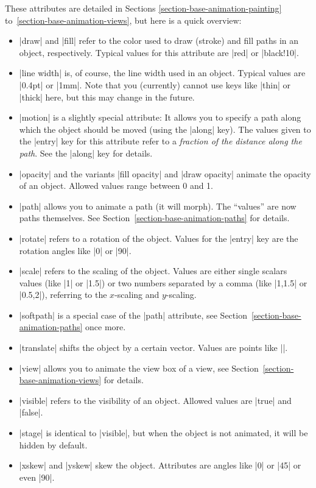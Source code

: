 \begin{command}{\pgfanimateattribute{}}
    These attributes are detailed in Sections
    \ref{section-base-animation-painting}
    to~\ref{section-base-animation-views}, but here is a quick overview:
    \begin{itemize}
        \item |draw| and |fill| refer to the color used to draw (stroke) and
            fill paths in an object, respectively. Typical values for this
            attribute are |red| or |black!10|.
        \item |line width| is, of course, the line width used in an object.
            Typical values are |0.4pt| or |1mm|. Note that you (currently)
            cannot use keys like |thin| or |thick| here, but this may change in
            the future.
        \item |motion| is a slightly special attribute: It allows you to
            specify a path along which the object should be moved (using the
            |along| key). The values given to the |entry| key for this
            attribute refer to a \emph{fraction of the distance along the
            path}. See the |along| key for details.
        \item |opacity| and the variants |fill opacity| and |draw opacity|
            animate the opacity of an object. Allowed values range between 0
            and 1.
        \item |path| allows you to animate a path (it will morph). The
            ``values'' are now paths themselves. See
            Section~\ref{section-base-animation-paths} for details.
        \item |rotate| refers to a rotation of the object. Values for the
            |entry| key are the rotation angles like |0| or |90|.
        \item |scale| refers to the scaling of the object. Values are either
            single scalars values (like |1| or  |1.5|) or two numbers separated
            by a comma (like |1,1.5| or |0.5,2|), referring to the $x$-scaling
            and $y$-scaling.
        \item |softpath| is a special case of the |path| attribute, see
            Section~\ref{section-base-animation-paths} once more.
        \item |translate| shifts the object by a certain vector. Values are
            points like |\pgfpoint{1cm}{2cm}|.
        \item |view| allows you to animate the view box of a view, see
            Section~\ref{section-base-animation-views} for details.
        \item |visible| refers to the visibility of an object. Allowed values
            are |true| and |false|.
        \item |stage| is identical to |visible|, but when the object is not
            animated, it will be hidden by default.
        \item |xskew| and |yskew| skew the object. Attributes are angles like
            |0| or |45| or even |90|.
    \end{itemize}



\end{command}
